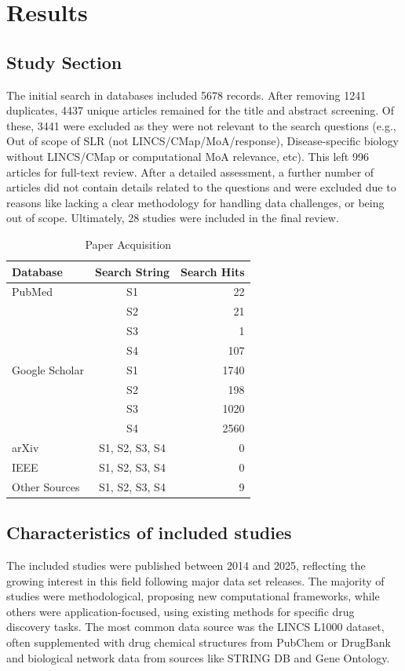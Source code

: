 \documentclass[twocolumn]{article}
\begin{document}
\section{Results}
\subsection{Study Section}
The initial search in databases included 5678 records. After removing 1241 duplicates, 4437 unique articles remained for the title and abstract screening. Of these, 3441 were excluded as they were not relevant to the search questions (e.g., Out of scope of SLR (not LINCS/CMap/MoA/response), Disease-specific biology without LINCS/CMap or computational MoA relevance, etc). This left 996 articles for full-text review. After a detailed assessment, a further number of articles did not contain details related to the questions and were excluded due to reasons like lacking a clear methodology for handling data challenges, or being out of scope. Ultimately, 28 studies were included in the final review.
\begin{table}[htbp]
  \centering
  \caption{Paper Acquisition}
  \begin{tabular}{%
    l %
    c %
    r %
  }
    \toprule
    \textbf{Database} & \textbf{Search String} & \textbf{Search Hits} \\
    \midrule
    PubMed & S1 & 22 \\
    & S2 & 21 \\
    & S3 & 1 \\ 
    & S4 & 107 \\
    \addlinespace
    Google Scholar & S1 & 1740 \\
    & S2 & 198 \\
    & S3 & 1020 \\
    & S4 & 2560 \\
    \addlinespace
    arXiv & S1, S2, S3, S4 & 0 \\
    \addlinespace
    IEEE & S1, S2, S3, S4 & 0 \\
    \addlinespace
    Other Sources & S1, S2, S3, S4 & 9 \\
    \bottomrule
  \end{tabular}
\end{table}


\subsection{Characteristics of included studies}
The included studies were published between 2014 and 2025, reflecting the growing interest in this field following major data set releases. The majority of studies were methodological, proposing new computational frameworks, while others were application-focused, using existing methods for specific drug discovery tasks. The most common data source was the LINCS L1000 dataset, often supplemented with drug chemical structures from PubChem or DrugBank and biological network data from sources like STRING DB and Gene Ontology\cite{wang2016drug}.
\end{document}
